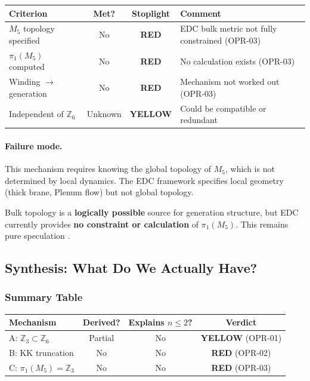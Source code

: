 \begin{center}
\small
\begin{tabular}{p{3cm}ccp{5cm}}
\toprule
\textbf{Criterion} & \textbf{Met?} & \textbf{Stoplight} & \textbf{Comment} \\
\midrule
$M_5$ topology specified & No & \textcolor{red!80!black}{\textbf{RED}} & EDC bulk metric not fully constrained (OPR-03) \\
$\pi_1(M_5)$ computed & No & \textcolor{red!80!black}{\textbf{RED}} & No calculation exists (OPR-03) \\
Winding $\to$ generation & No & \textcolor{red!80!black}{\textbf{RED}} & Mechanism not worked out (OPR-03) \\
Independent of $\mathbb{Z}_6$ & Unknown & \textcolor{orange!80!black}{\textbf{YELLOW}} & Could be compatible or redundant \\
\bottomrule
\end{tabular}
\end{center}

\paragraph{Failure mode.}
This mechanism requires knowing the global topology of $M_5$, which is not
determined by local dynamics. The EDC framework specifies local geometry
(thick brane, Plenum flow) but not global topology.

\begin{tcolorbox}[colback=red!5, colframe=red!50!black,
    title=\textbf{Mechanism C Verdict: RED}]
Bulk topology is a \textbf{logically possible} source for generation structure,
but EDC currently provides \textbf{no constraint or calculation} of $\pi_1(M_5)$.
This remains pure speculation \tagP{}.
\end{tcolorbox}

\subsection{Synthesis: What Do We Actually Have?}
\label{sec:ch5_synthesis}

\subsubsection{Summary Table}

\begin{center}
\begin{tabular}{p{4cm}ccc}
\toprule
\textbf{Mechanism} & \textbf{Derived?} & \textbf{Explains $n \leq 2$?} & \textbf{Verdict} \\
\midrule
A: $\mathbb{Z}_3 \subset \mathbb{Z}_6$ & Partial \tagI{} & No & \textcolor{orange!80!black}{\textbf{YELLOW}} (OPR-01) \\
B: KK truncation & No \tagP{} & No & \textcolor{red!80!black}{\textbf{RED}} (OPR-02) \\
C: $\pi_1(M_5) = \mathbb{Z}_3$ & No \tagP{} & No & \textcolor{red!80!black}{\textbf{RED}} (OPR-03) \\
\bottomrule
\end{tabular}
\end{center}

